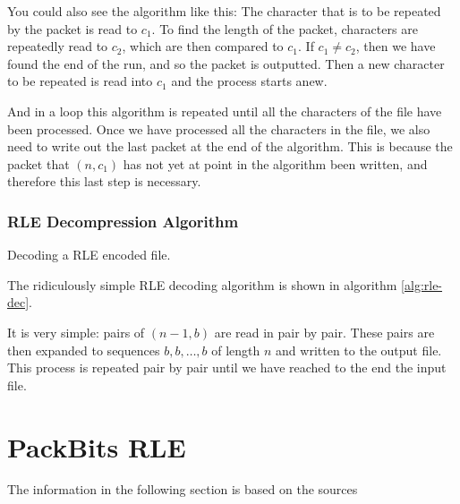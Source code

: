 You could also see the algorithm like this: The character that is to
be repeated by the packet is read to $c_1$. To find the length of the
packet, characters are repeatedly read to $c_2$, which are then
compared to $c_1$. If $c_1 \neq c_2$, then we have found the end of
the run, and so the packet is outputted. Then a new character to be
repeated is read into $c_1$ and the process starts anew.

And in a loop this algorithm is repeated until all the characters of
the file have been processed. Once we have processed all the
characters in the file, we also need to write out the last packet at
the end of the algorithm. This is because the packet that $(n,c_1)$
has not yet at point in the algorithm been written, and therefore this
last step is necessary.

\subsubsection{RLE Decompression Algorithm}

\begin{algorithm}
  \caption{Decoding a RLE encoded file.}
  \label{alg:rle-dec}
  \begin{algorithmic}[1]


    \While{\neof}
    \State {}
    \EndRepeatn


    \EndWhile
  \end{algorithmic}
\end{algorithm}

The ridiculously simple RLE decoding algorithm is shown in algorithm
\ref{alg:rle-dec}.

It is very simple: pairs of $(n-1,b)$ are read in pair by pair. These
pairs are then expanded to sequences $b,b,\dots,b$ of length $n$ and
written to the output file. This process is repeated pair by pair
until we have reached to the end the input file.

\section{PackBits RLE}
\label{sec:packbits-version}

The information in the following section is based on the sources
\cite{96:_techn_note_tn102,apple1994inside,91:_truev_tga_file_format_specif}

